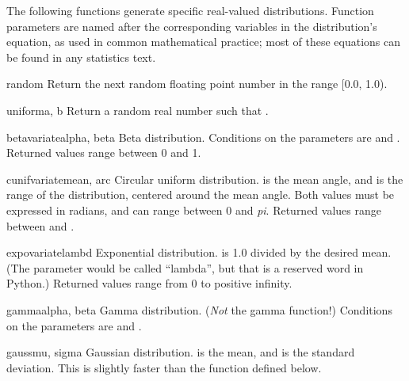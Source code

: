 {The following functions generate specific real-valued distributions.
Function parameters are named after the corresponding variables in the
distribution's equation, as used in common mathematical practice; most of
these equations can be found in any statistics text.

\begin{funcdesc}{random}{}
  Return the next random floating point number in the range [0.0, 1.0).
\end{funcdesc}

\begin{funcdesc}{uniform}{a, b}
  Return a random real number  such that
  .
\end{funcdesc}

\begin{funcdesc}{betavariate}{alpha, beta}
  Beta distribution.  Conditions on the parameters are
   and .
  Returned values range between 0 and 1.
\end{funcdesc}

\begin{funcdesc}{cunifvariate}{mean, arc}
  Circular uniform distribution.   is the mean angle, and
   is the range of the distribution, centered around the mean
  angle.  Both values must be expressed in radians, and can range
  between 0 and \emph{pi}.  Returned values range between
   and .
\end{funcdesc}

\begin{funcdesc}{expovariate}{lambd}
  Exponential distribution.   is 1.0 divided by the desired
  mean.  (The parameter would be called ``lambda'', but that is a
  reserved word in Python.)  Returned values range from 0 to
  positive infinity.
\end{funcdesc}

\begin{funcdesc}{gamma}{alpha, beta}
  Gamma distribution.  (\emph{Not} the gamma function!)  Conditions on
  the parameters are  and .
\end{funcdesc}

\begin{funcdesc}{gauss}{mu, sigma}
  Gaussian distribution.   is the mean, and  is the
  standard deviation.  This is slightly faster than the
   function defined below.
\end{funcdesc}

}
